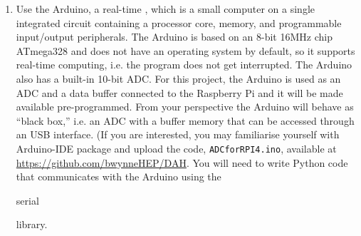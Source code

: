 \begin{enumerate}
%
%
%
%
% 

\item	Use the Arduino, a real-time \microcontroller, which is a small computer on a single integrated circuit containing a processor core, memory, and programmable input/output peripherals.
The Arduino is based on an 8-bit 16MHz chip ATmega328 and does not have an operating system by default, so it supports real-time computing, i.e. the program does not get interrupted.
The Arduino also has a built-in 10-bit ADC.
For this project, the Arduino is used as an ADC and a data buffer connected to the Raspberry Pi and it will be made available pre-programmed.
From your perspective the Arduino will behave as ``black box,'' i.e. an ADC with a buffer memory that can be accessed through an USB interface.
(If you are interested, you may familiarise yourself with Arduino-IDE package and upload the code, {\tt ADCforRPI4.ino}, available at \url{https://github.com/bwynneHEP/DAH}.
You will need to write Python code that communicates with the Arduino using the \begin{tt}serial\end{tt} library.


\end{enumerate}
